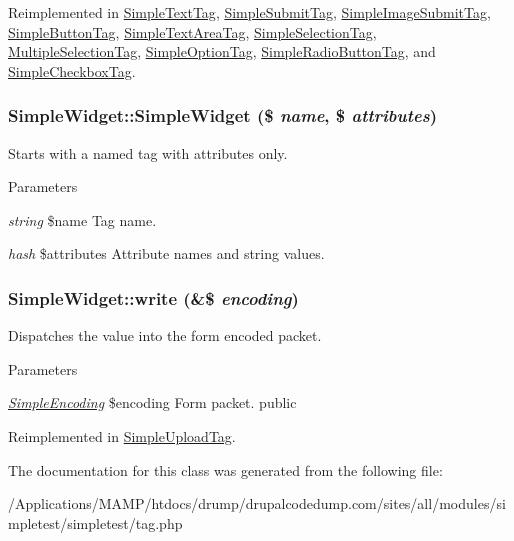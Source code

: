 Reimplemented in \hyperlink{class_simple_text_tag_a255675d0e1f881000de30be56723db31}{SimpleTextTag}, \hyperlink{class_simple_submit_tag_ac0e27babe9c5af762b7d9135062ebcf6}{SimpleSubmitTag}, \hyperlink{class_simple_image_submit_tag_ae66a60f527c8cde0d2fd883c3d894da3}{SimpleImageSubmitTag}, \hyperlink{class_simple_button_tag_a36d1a217cd1a0ec83bc0de7d7d436057}{SimpleButtonTag}, \hyperlink{class_simple_text_area_tag_a5b56885c1a6c81bd955963843586ad34}{SimpleTextAreaTag}, \hyperlink{class_simple_selection_tag_a3cf6ad438463a73871ef02f729a7b25b}{SimpleSelectionTag}, \hyperlink{class_multiple_selection_tag_a856ea3732ddfc727b1196ac769d5e487}{MultipleSelectionTag}, \hyperlink{class_simple_option_tag_ab8296c8c864cb50ab4e43fe58caa3576}{SimpleOptionTag}, \hyperlink{class_simple_radio_button_tag_a501c46e35c07e6d509aff9576eeda833}{SimpleRadioButtonTag}, and \hyperlink{class_simple_checkbox_tag_a9ff9d413cacf20c94173be8c16022fa0}{SimpleCheckboxTag}.\hypertarget{class_simple_widget_a76a5c48eb5110ad5bb13f683ea4c77bf}{
\subsubsection[{SimpleWidget}]{\setlength{\rightskip}{0pt plus 5cm}SimpleWidget::SimpleWidget (\$ {\em name}, \/  \$ {\em attributes})}}
\label{class_simple_widget_a76a5c48eb5110ad5bb13f683ea4c77bf}
Starts with a named tag with attributes only. 
\begin{DoxyParams}{Parameters}
\item[{\em string}]\$name Tag name. \item[{\em hash}]\$attributes Attribute names and string values. \end{DoxyParams}
\hypertarget{class_simple_widget_a5e546ea2ab317409554f80ba2313f7f2}{
\subsubsection[{write}]{\setlength{\rightskip}{0pt plus 5cm}SimpleWidget::write (\&\$ {\em encoding})}}
\label{class_simple_widget_a5e546ea2ab317409554f80ba2313f7f2}
Dispatches the value into the form encoded packet. 
\begin{DoxyParams}{Parameters}
\item[{\em \hyperlink{class_simple_encoding}{SimpleEncoding}}]\$encoding Form packet.  public \end{DoxyParams}


Reimplemented in \hyperlink{class_simple_upload_tag_a0d75761c4b47163eff52715789037595}{SimpleUploadTag}.

The documentation for this class was generated from the following file:\begin{DoxyCompactItemize}
\item 
/Applications/MAMP/htdocs/drump/drupalcodedump.com/sites/all/modules/simpletest/simpletest/tag.php\end{DoxyCompactItemize}
